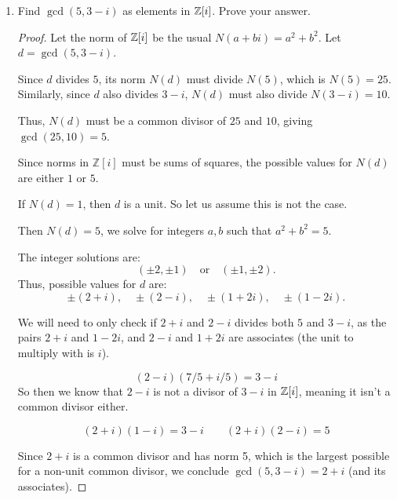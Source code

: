 \documentclass[12pt]{article}
\begin{document}
\begin{enumerate}
\begin{enumerate}
\begin{proof}
				So assume $N(f) = p$ and $N(g) = p$.\\
				Then $f = a+bi$ for some $a,b\in\Z$, so $N(f) = a^2+b^2 = p$. Since $0^2 \equiv 2^2 \equiv 0 \mod 4$ and $1^2 \equiv 3^2 \equiv 1 \mod 4$, we know that $a^2 \! \mod 4$ and $b^2 \! \mod 4$ must also be either $0$ or $1$. But then $a^2 + b^2 \nequiv 3 \mod 4$, which is a contradiction since $p\equiv3\mod4$. \contra
			\end{proof}
		\end{enumerate}
		
		
		\item Find $\gcd(5,3-i)$ as elements in $\mathbb{Z}[i]$. Prove your answer.
		\begin{proof}
			Let the norm of $\mathbb{Z}[i]$ be the usual $N(a+bi) = a^2+b^2$. Let $d = \gcd(5,3-i)$.
			
			Since $d$ divides $5$, its norm $N(d)$ must divide $N(5)$, which is $N(5)=25$. Similarly, since $d$ also divides $3 - i$, $N(d)$ must also divide $N(3 - i) = 10$.
			
			Thus, $N(d)$ must be a common divisor of $25$ and $10$, giving $\gcd(25, 10) = 5$.
			
			Since norms in $\mathbb{Z}[i]$ must be sums of squares, the possible values for $N(d)$ are either $1$ or $5$.
			
			If $N(d) = 1$, then $d$ is a unit. So let us assume this is not the case.
			
			Then $N(d) = 5$, we solve for integers $a, b$ such that $a^2 + b^2 = 5$.
			
			The integer solutions are:
			\[
			(\pm 2, \pm 1) \quad \text{or} \quad (\pm 1, \pm 2).
			\]
			Thus, possible values for \( d \) are:
			\[
			\pm (2 + i), \quad \pm (2 - i), \quad \pm (1 + 2i), \quad \pm (1 - 2i).
			\]
			
			We will need to only check if $2+i$ and $2-i$ divides both $5$ and $3-i$, as the pairs $2+i$ and $1-2i$, and $2-i$ and $1+2i$ are associates (the unit to multiply with is $i$).
			
			\[(2-i)(7/5 + i/5) = 3 - i\]
			So then we know that $2-i$ is not a divisor of $3-i$ in $\mathbb{Z}[i]$, meaning it isn't a common divisor either.
			
			\[(2+i)(1-i) = 3-i \qquad (2+i)(2-i) = 5 \]
			
			Since $2+i$ is a common divisor and has norm 5, which is the largest possible for a non-unit common divisor, we conclude $\gcd(5, 3 - i) = 2+i$ (and its associates).
		\end{proof}
		

\end{enumerate}
\end{document}
